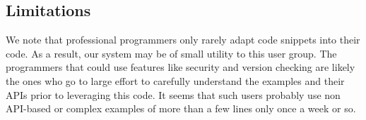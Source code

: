 \subsection{Limitations}

We note that professional programmers only rarely adapt code snippets into their code.
As a result, our system may be of small utility to this user group.
The programmers that could use features like security and version checking are likely the ones who go to large effort to carefully understand the examples and their APIs prior to leveraging this code.
It seems that such users probably use non API-based or complex examples of more than a few lines only once a week or so.
